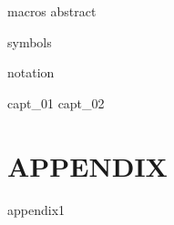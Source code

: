 \documentclass[11pt,oneside,english]{book}
\begin{document}



\runfrontend{}

{macros}
{abstract}

\sumario

\listadefiguras

\listadetabelas

\listadeacronimos


\markboth{}{}

{symbols}

{notation}

\mainmatter 
\setcounter{page}{1} \pagestyle{plain} 

{capt_01}
{capt_02}


%
%
%


\part*{APPENDIX}
\appendix
{appendix1}
\end{document}

